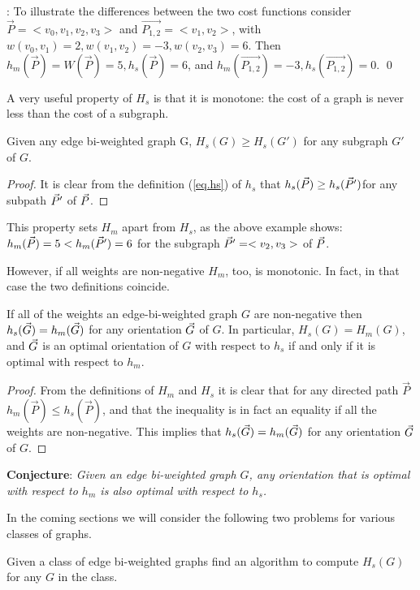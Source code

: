 : To illustrate the differences between the two cost functions consider
 $\vec{P}=<v_0,v_1,v_2,v_3>$ and $\vec{P_{1,2}}=<v_1,v_2>$, with $w(v_0,v_1)=2, w(v_1,v_2)=-3,w(v_2,v_3)=6$.
 Then $h_m(\vec{P})=W(\vec{P})=5, h_s(\vec{P})=6$, and 
 $h_m(\vec{P_{1,2}})=-3, h_s(\vec{P_{1,2}})=0$.
 \qed

A very useful property of $H_s$ is that it is monotone: the cost of a graph is never less than the cost of a subgraph.
\begin{lemma}\label{lem:sprop}
	Given any edge bi-weighted graph G,
	$H_{s}(G)\geq  H_{s}(G')$ for any subgraph $G'$ of $G$. 
\end{lemma}

\begin{proof}
It is clear from the definition (\ref{eq.hs}) of $h_s$ that $h_s(\vec{P})\geq h_s(\vec{P} ')$for any subpath 
$\vec{P} '$ of $\vec{P}$.  
\end{proof}

This property sets $H_m$ apart from $H_s$,  as the above example shows:
$h_{m}(\vec{P})=5 <  h_{m}(\vec{P}')=6$ for the subgraph $\vec{P} '=<v_2,v_3>$ of $\vec{P}$.

However, if all weights are non-negative $H_m$, too, is monotonic. In fact, in that case the two definitions coincide.

\begin{lemma}
	If all of the weights an edge-bi-weighted graph $G$ are non-negative 
	then $h_{s}( \vec{G} )= h_{m}( \vec{G} )$ for any orientation $\vec{G}$ of $G$.
	In particular,  $H_{s}(G)= H_{m}(G)$,  and 
	$\vec{G}$ is an optimal orientation of $G$ with respect to $h_{s}$
	if and only if it is optimal with respect to $ h_{m} $.
\end{lemma}
\begin{proof}
From the definitions of $H_m$ and $H_s$ it is clear that for any directed path $\vec{P}$ $h_{m}(\vec{P})\leq  h_{s}(\vec{P})$, and that the inequality is in fact an equality if all the weights 
are non-negative. This implies that $h_{s}( \vec{G} )= h_{m}( \vec{G} )$ for any orientation $\vec{G}$ of $G$.
\end{proof}

\bigskip
{\bf Conjecture}:
\textit{Given an edge bi-weighted graph $G$, any orientation that is optimal with 
	respect to $h_{m}$ is also optimal with respect to $h_{s} $.}

\bigskip
In the coming sections we will consider the following two problems
for various classes of graphs.

\begin{problem}[
	HS]
	Given a class of edge bi-weighted graphs find an algorithm to compute
	$H_s(G) $
	for any $G$
	in the class.
\end{problem}


